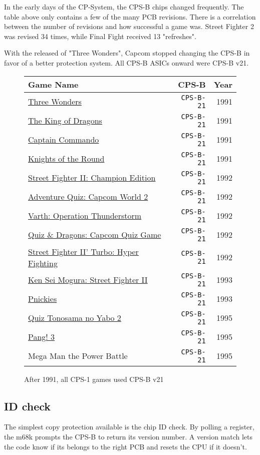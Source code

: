 In the early days of the CP-System, the CPS-B chips changed frequently. The table above only contains a few of the many PCB revisions. There is a correlation between the number of revisions and how successful a game was. Street Fighter 2 was revised 34 times, while Final Fight received 13 "refreshes".

With the released of "Three Wonders", Capcom stopped changing the CPS-B in favor of a better protection system. All CPS-B ASICs onward were CPS-B v21.

\begin{figure}[H]
{ \setlength{\tabcolsep}{3.0pt}
\begin{tabularx}{\textwidth}{Xrr} 
  \textbf{Game Name} & \textbf{ CPS-B }  & \textbf{ Year } \\               
  \toprule    
\href{}{Three Wonders} &  \texttt{CPS-B-21} & 1991 \\ 
\href{}{The King of Dragons} &  \texttt{CPS-B-21} &1991 \\ 
\href{}{Captain Commando} &  \texttt{CPS-B-21} & 1991 \\ 
\href{}{Knights of the Round} &  \texttt{CPS-B-21} &1991 \\ 
  \toprule    
\href{}{Street Fighter II: Champion Edition} &  \texttt{CPS-B-21} &1992 \\ 
\href{}{Adventure Quiz: Capcom World 2} &  \texttt{CPS-B-21} &1992 \\ 
\href{}{Varth: Operation Thunderstorm} &  \texttt{CPS-B-21} &1992 \\ 
\href{}{Quiz \& Dragons: Capcom Quiz Game} &  \texttt{CPS-B-21} &1992 \\ 
\href{}{Street Fighter II' Turbo: Hyper Fighting} &  \texttt{CPS-B-21} & 1992 \\ 
  \toprule    
\href{}{Ken Sei Mogura: Street Fighter II} &  \texttt{CPS-B-21} &1993 \\ 
\href{}{Pnickies} &  \texttt{CPS-B-21} &1993 \\ 
  \toprule    
\href{}{Quiz Tonosama no Yabo 2} &  \texttt{CPS-B-21} & 1995 \\ 
\href{}{Pang! 3} & \texttt{CPS-B-21}  & 1995 \\ 
Mega Man the Power Battle & \texttt{CPS-B-21}  & 1995 \\

\toprule    
\end{tabularx}%
}\caption*{After 1991, all CPS-1 games used CPS-B v21}
\end{figure}


\subsection{ID check}
The simplest copy protection available is the chip ID check. By polling a register, the m68k prompts the CPS-B to return its version number. A version match lets the code know if its belongs to the right PCB and resets the CPU if it doesn't. 

